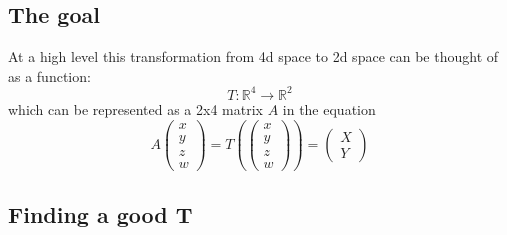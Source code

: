 \documentclass{article}
\begin{document}
\subsection{The goal}
At a high level this transformation from 4d space to 2d space can be thought of as a function:
\[T: \mathbb{R}^4 \to \mathbb{R}^2\]
which can be represented as a 2x4 matrix $A$ in the equation
\[A\begin{pmatrix}
x \\ y \\ z \\ w
\end{pmatrix} = T\left(\begin{pmatrix}
    x \\ y \\ z \\ w
    \end{pmatrix}\right) = \begin{pmatrix}
X \\ Y
\end{pmatrix}\]
\subsection{Finding a good T}
\end{document}
